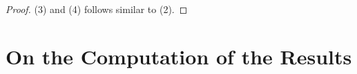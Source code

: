 \documentclass[noend]{amsproc}
\theoremstyle{definition}
\DeclareMathOperator{\R}{\mathbb{R}}
\DeclareMathOperator{\C}{\mathbb{C}}
\DeclareMathOperator{\K}{\mathbb{K}}
\DeclareMathOperator{\T}{T}
\begin{document}
\begin{proof}
(3) and (4)  follows similar to (2).

%
%
\end{proof}




\section{On the Computation of the Results}\label{OnTheComputationOfTheResults}
\end{document}
